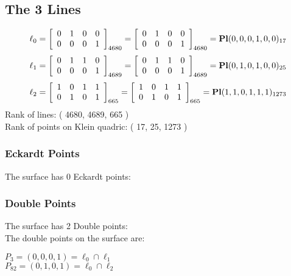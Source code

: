 \documentclass{article}
\begin{document}
{\subsection*{The 3 Lines}
$$
\ell_{0} = 
\left[
\begin{array}{*{4}{r}}
0 & 1 & 0 & 0\\
0 & 0 & 0 & 1\\
\end{array}
\right]
_{4680}
=
\left[
\begin{array}{*{4}c}
0  & 1  & 0  & 0\\
0  & 0  & 0  & 1\\
\end{array}
\right]_{4680}
={\rm\bf Pl}(0,0,0,1,0,0 )_{17}$$
$$
\ell_{1} = 
\left[
\begin{array}{*{4}{r}}
0 & 1 & 1 & 0\\
0 & 0 & 0 & 1\\
\end{array}
\right]
_{4689}
=
\left[
\begin{array}{*{4}c}
0  & 1  & 1  & 0\\
0  & 0  & 0  & 1\\
\end{array}
\right]_{4689}
={\rm\bf Pl}(0,1,0,1,0,0 )_{25}$$
$$
\ell_{2} = 
\left[
\begin{array}{*{4}{r}}
1 & 0 & 1 & 1\\
0 & 1 & 0 & 1\\
\end{array}
\right]
_{665}
=
\left[
\begin{array}{*{4}c}
1  & 0  & 1  & 1\\
0  & 1  & 0  & 1\\
\end{array}
\right]_{665}
={\rm\bf Pl}(1,1,0,1,1,1 )_{1273}$$
Rank of lines: ( 4680, 4689, 665 )\\
Rank of points on Klein quadric: ( 17, 25, 1273 )\\
\subsubsection*{Eckardt Points}
The surface has 0 Eckardt points:\\
\subsubsection*{Double Points}
The surface has 2 Double points:\\
The double points on the surface are:\\
\begin{multicols}{2}
\noindent
$P_{3} = ( 0, 0, 0, 1 ) = \ell_{0} \cap \ell_{1} $\\
$P_{82} = ( 0, 1, 0, 1 ) = \ell_{0} \cap \ell_{2} $\\
\end{multicols}
}
\end{document}
